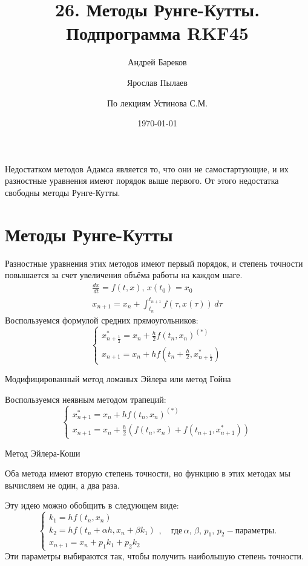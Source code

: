 \documentclass[a4paper,11pt]{article}
\title{26. Методы Рунге-Кутты. Подпрограмма \textbf{RKF45}}
\author{Андрей Бареков \and Ярослав Пылаев \and По лекциям Устинова С.М.}
\date{\today}
\begin{document}
\maketitle
\newpage

Недостатком методов Адамса является то, что они не самостартующие, и их разностные уравнения имеют порядок выше первого.
  От этого недостатка свободны методы Рунге-Кутты.

\section{Методы Рунге-Кутты}
Разностные уравнения этих методов имеют первый порядок\footnotemark, и степень точности повышается за счет увеличения объёма работы на каждом шаге.
\begin{gather}
  \frac{dx}{dt} = f(t, x),\, x(t_0) = x_0 \\
  x_{n+1} = x_n + \int_{t_n}^{t_{n+1}} f(\tau, x(\tau))\,d\tau
\end{gather}
Воспользуемся формулой средних прямоугольников: \\
\begin{equation}
  \begin{cases}
    x_{n+\frac{1}{2}}^* = x_n + \frac{h}{2} f(t_n, x_n)^{(*)} \\
    x_{n+1} = x_n + hf(t_n + \frac{h}{2}, x_{n+\frac{1}{2}}^*)
  \end{cases}
  \label{eq:HM}
\end{equation}
\begin{center}
  \small{Модифицированный метод ломаных Эйлера или метод Гойна}
\end{center}
Воспользуемся неявным методом трапеций:
\begin{equation}
  \begin{cases}
    x_{n+1}^* = x_n + hf(t_n, x_n)^{(*)} \\
    x_{n+1} = x_n + \frac{h}{2}(f(t_n, x_n) + f(t_{n+1}, x_{n+1}^*))
  \end{cases}
  \label{eq:ECM}
\end{equation}
\begin{center}
  \small{Метод Эйлера-Коши}
\end{center}
Оба метода имеют вторую степень точности, но функцию в этих методах мы вычисляем не один, а два раза. \\
\begin{importantblock}
  Эту идею можно обобщить в следующем виде:
  \begin{equation}
    \begin{cases}
      k_1 = hf(t_n, x_n) \\
      k_2 = hf(t_n + \alpha h, x_n + \beta k_1) \\
      x_{n+1} = x_n + p_1k_1 + p_2k_2
    \end{cases},\quad \text{где}\, \alpha,\, \beta,\, p_1,\, p_2 - \text{параметры.}
    \label{eq:RKM}
  \end{equation}
  Эти параметры выбираются так, чтобы получить наибольшую степень точности.
\end{importantblock}
\end{document}
